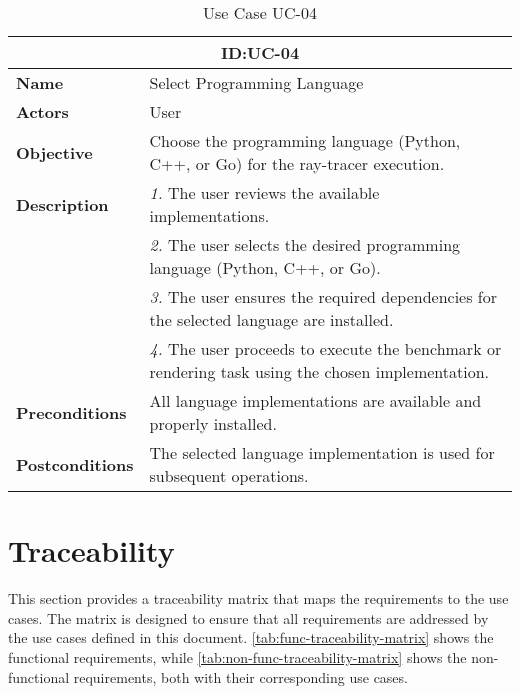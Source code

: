 \begin{table}[H]
    \centering
    \begin{tabular}{l p{10cm}}
        \toprule
        \multicolumn{2}{c}{\textbf{ID:\@ UC-04}} \\
        \toprule
        \textbf{Name}               &  Select Programming Language \\
        \textbf{Actors}             &  User \\
        \textbf{Objective}          &  Choose the programming language (Python, C++, or Go) for the ray-tracer execution. \\
        \textbf{Description}        & \textsl{1.} The user reviews the available implementations. \\
                                   & \textsl{2.} The user selects the desired programming language (Python, C++, or Go). \\
                                   & \textsl{3.} The user ensures the required dependencies for the selected language are installed. \\
                                   & \textsl{4.} The user proceeds to execute the benchmark or rendering task using the chosen implementation. \\
        \textbf{Preconditions}      &  All language implementations are available and properly installed. \\
        \textbf{Postconditions}     &  The selected language implementation is used for subsequent operations. \\
    \end{tabular}
    \caption{Use Case UC-04}\label{tab:uc-04}
\end{table}


\section{Traceability}

This section provides a traceability matrix that maps the requirements to the use cases. The matrix is designed to ensure that all requirements are addressed by the use cases defined in this document. \autoref{tab:func-traceability-matrix} shows the functional requirements, while \autoref{tab:non-func-traceability-matrix} shows the non-functional requirements, both with their corresponding use cases.



